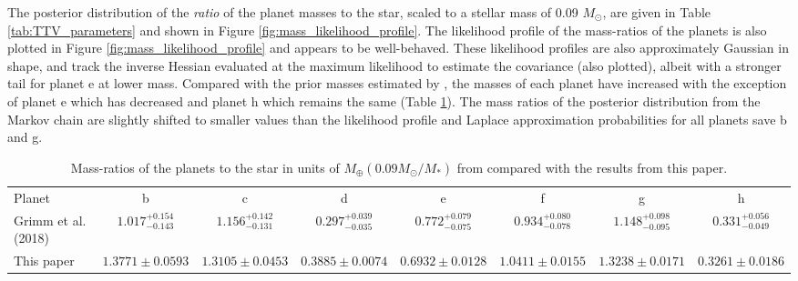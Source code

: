 \documentclass[twocolumn]{aastex63}
\begin{document}
The posterior distribution of the {\it ratio} of the planet masses to the star, scaled to a stellar mass of 0.09 $M_\odot$, are given in Table \ref{tab:TTV_parameters} and shown in Figure \ref{fig:mass_likelihood_profile}.  The likelihood profile of
the mass-ratios of the planets is also plotted in 
Figure \ref{fig:mass_likelihood_profile} and appears to be well-behaved. These
likelihood profiles are also approximately Gaussian in shape, and track the inverse Hessian evaluated at the maximum likelihood to estimate the covariance (also plotted), albeit with a stronger
tail for planet e at lower mass.  Compared with the prior masses
estimated by \citet{Grimm2018}, the masses of each planet have increased
with the exception of planet e which has decreased and planet h which remains the same (Table \ref{tab:grimm_vs_agol}).   The mass ratios of the posterior distribution from the Markov chain  are slightly shifted to smaller values than the likelihood profile and Laplace approximation probabilities for all planets save b and g. 

\begin{table}
    \centering
    \scriptsize
    \caption{Mass-ratios of the planets to the star in units of
    $M_\oplus (0.09 M_\odot/M_*)$ from \citet{Grimm2018} compared with the results from this paper.}
    \begin{tabular}{l|c|c|c|c|c|c|c}
       Planet  & b & c & d & e & f & g & h  \\
       Grimm et al. (2018) & $1.017_{-0.143}^{+ 0.154}$ & $1.156_{- 0.131 }^{+0.142}$ & $0.297_{- 0.035}^{+ 0.039}$ & $0.772_{- 0.075}^{+ 0.079}$ & $0.934_{- 0.078 }^{+0.080}$ & $1.148_{- 0.095}^{+ 0.098}$ & $0.331_{- 0.049}^{+ 0.056}$\\
       This paper & $1.3771{\pm} 0.0593$ & $1.3105{\pm}0.0453$ & $0.3885{\pm}0.0074$ & $0.6932{\pm}0.0128$ & $1.0411{\pm}0.0155$ & $1.3238{\pm}0.0171$ & $0.3261{\pm}0.0186$ \\
    \end{tabular}
    
    \label{tab:grimm_vs_agol}
\end{table}
\end{document}
